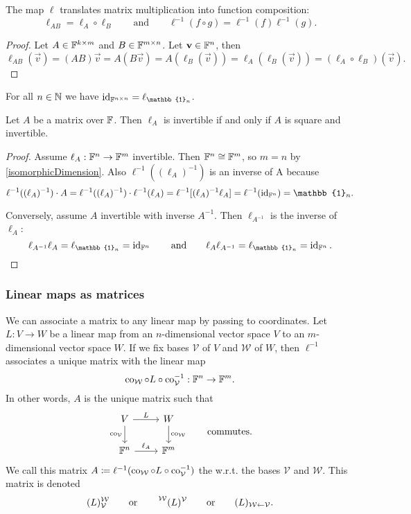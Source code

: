 \begin{proposition}
The map $\ell$ translates matrix multiplication into function composition:
\[ \ell_{AB} = \ell_A \circ \ell_B \qquad\text{and}\qquad \ell^{-1}(f\circ g) = \ell^{-1}(f)\ell^{-1}(g). \]
\end{proposition}
\begin{proof}
Let $A\in \mathbb{F}^{k\times m}$ and $B\in \mathbb{F}^{m\times n}$. Let $\boldsymbol{\mathrm{v}}\in\mathbb{F}^n$, then
\[ \ell_{AB}(\vec{v}) = (AB)\vec{v} = A(B\vec{v}) = A(\ell_B(\vec{v})) = \ell_A(\ell_B(\vec{v})) = (\ell_A\circ\ell_B)(\vec{v}). \]
\end{proof}

\begin{lemma}
For all $n\in\mathbb{N}$ we have $\id_{\F^{n\times n}} = \ell_{\mathbb{1}_n}$.
\end{lemma}

\begin{lemma} \label{invertibleMapInvertibleMatrix}
Let $A$ be a matrix over $\mathbb{F}$. Then $\ell_A$ is invertible \textup{if and only if} $A$ is square and invertible.
\end{lemma}
\begin{proof}
Assume $\ell_A: \mathbb{F}^n\to\mathbb{F}^m$ invertible. Then $\mathbb{F}^n\cong\mathbb{F}^m$, so $m=n$ by \ref{isomorphicDimension}. Also $\ell^{-1}((\ell_A)^{-1})$ is an inverse of A because
\[ \ell^{-1}((\ell_A)^{-1})\cdot A = \ell^{-1}((\ell_A)^{-1})\cdot\ell^{-1}(\ell_A) = \ell^{-1}[(\ell_A)^{-1}\ell_A] = \ell^{-1}(\id_{\F^n}) = \mathbb{1}_n. \]

Conversely, assume $A$ invertible with inverse $A^{-1}$. Then $\ell_{A^{-1}}$ is the inverse of $\ell_A$:
\[ \ell_{A^{-1}}\ell_A = \ell_{\mathbb{1}_n} = \id_{\F^n} \qquad \text{and}\qquad \ell_A\ell_{A^{-1}} = \ell_{\mathbb{1}_n} = \id_{\F^n}. \]
\end{proof}

\subsubsection{Linear maps as matrices}
We can associate a matrix to any linear map by passing to coordinates. Let $L: V\to W$ be a linear map from an $n$-dimensional vector space $V$ to an $m$-dimensional vector space $W$. If we fix bases $\mathcal{V}$ of $V$ and $\mathcal{W}$ of $W$, then $\ell^{-1}$ associates a unique matrix with the linear map
\[ \operatorname{co}_{\mathcal{W}}\circ L \circ \operatorname{co}^{-1}_{\mathcal{V}}: \mathbb{F}^n\to\mathbb{F}^m. \]
In other words, $A$ is the unique matrix such that
\[ \begin{tikzcd}
V\rar{L}\dar[swap]{\co_{\mathcal{V}}} & W \dar{\co_{\mathcal{W}}} \\
\F^n \rar{\ell_A} & \F^m
\end{tikzcd} \qquad \text{commutes.} \]
We call this matrix $A \coloneqq \ell^{-1}(\operatorname{co}_{\mathcal{W}}\circ L \circ \operatorname{co}^{-1}_{\mathcal{V}})$ the  w.r.t. the bases $\mathcal{V}$ and $\mathcal{W}$. This matrix is denoted
\[ (L)_{\mathcal{V}}^{\mathcal{W}} \qquad \text{or}\qquad \prescript{\mathcal{W}}{}{(L)}^{\mathcal{V}} \qquad \text{or}\qquad (L)_{\mathcal{W}\leftarrow \mathcal{V}}. \]

